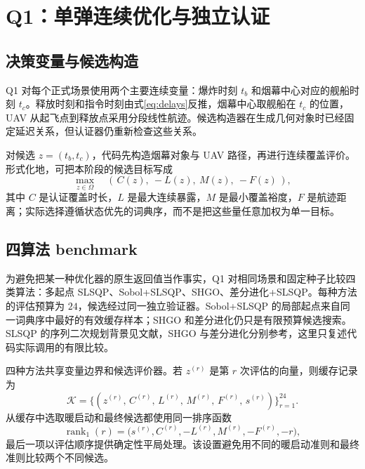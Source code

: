 \section{Q1：单弹连续优化与独立认证}

\subsection{决策变量与候选构造}

Q1 对每个正式场景使用两个主要连续变量：爆炸时刻 $t_b$ 和烟幕中心对应的舰船时刻 $t_c$。释放时刻和指令时刻由式\eqref{eq:delays}反推，烟幕中心取舰船在 $t_c$ 的位置，UAV 从起飞点到释放点采用分段线性航迹。候选构造器在生成几何对象时已经固定延迟关系，但认证器仍重新检查这些关系。

对候选 $z=(t_b,t_c)$，代码先构造烟幕对象与 UAV 路径，再进行连续覆盖评价。形式化地，可把本阶段的候选目标写成
\begin{equation}
  \max_{z\in\Omega}\quad \left(\,C(z),\ -L(z),\ M(z),\ -F(z)\,\right),
  \label{eq:q1-objective}
\end{equation}
其中 $C$ 是认证覆盖时长，$L$ 是最大连续暴露，$M$ 是最小覆盖裕度，$F$ 是航迹距离；实际选择遵循状态优先的词典序，而不是把这些量任意加权为单一目标。

\subsection{四算法 benchmark}

为避免把某一种优化器的原生返回值当作事实，Q1 对相同场景和固定种子比较四类算法：多起点 SLSQP、Sobol+SLSQP、SHGO、差分进化+SLSQP。每种方法的评估预算为 $24$，候选经过同一独立验证器。Sobol+SLSQP 的局部起点来自同一词典序中最好的有效缓存样本；SHGO 和差分进化仍只是有限预算候选搜索。SLSQP 的序列二次规划背景见文献\cite{kraft1988slsqp,byrd1995sqp}，SHGO 与差分进化分别参考\cite{endes2018shgo,storn1997differential}，这里只复述代码实际调用的有限比较。

四种方法共享变量边界和候选评价器。若 $z^{(r)}$ 是第 $r$ 次评估的向量，则缓存记录为
\begin{equation}
  \mathcal{K}=\{(z^{(r)},\,C^{(r)},\,L^{(r)},\,M^{(r)},\,F^{(r)},\,s^{(r)})\}_{r=1}^{24}.
  \label{eq:q1-cache}
\end{equation}
从缓存中选取暖启动和最终候选都使用同一排序函数
\begin{equation}
  \operatorname{rank}_1(r)=\bigl(s^{(r)},C^{(r)},-L^{(r)},M^{(r)},-F^{(r)},-r\bigr),
  \label{eq:q1-rank}
\end{equation}
最后一项以评估顺序提供确定性平局处理。该设置避免用不同的暖启动准则和最终准则比较两个不同候选。

